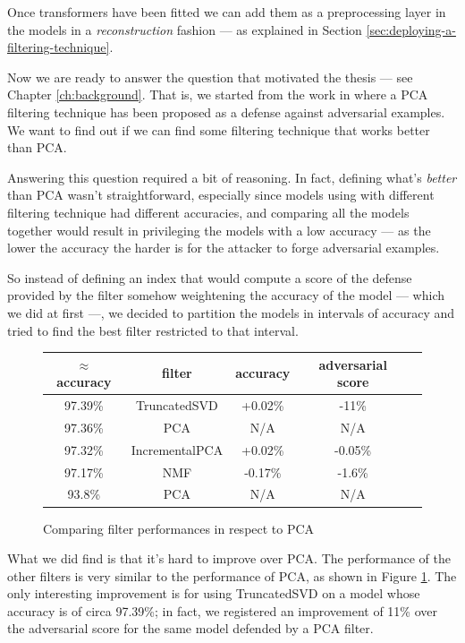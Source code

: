 Once transformers have been fitted we can add them as a preprocessing
layer in the models in a \emph{reconstruction} fashion --- as explained
in Section \ref{sec:deploying-a-filtering-technique}.

Now we are ready to answer the question that motivated the thesis ---
see Chapter \ref{ch:background}. That is, we started from the work in
\cite{bhagoji2018enhancing} where a PCA filtering technique has been
proposed as a defense against adversarial examples. We want to find out
if we can find some filtering technique that works better than PCA.

Answering this question required a bit of reasoning. In fact, defining
what's \emph{better} than PCA wasn't straightforward, especially since
models using with different filtering technique had different
accuracies, and comparing all the models together would result in
privileging the models with a low accuracy --- as the lower the
accuracy the harder is for the attacker to forge adversarial examples.

So instead of defining an index that would compute a score of the
defense provided by the filter somehow weightening the accuracy of the
model --- which we did at first ---, we decided to partition the models
in intervals of accuracy and tried to find the best filter restricted
to that interval.

\begin{figure}
  \centering
  \begin{tabular}{|c|c|c|c|c|}
    \hline
    $\approx$accuracy & filter & accuracy & adversarial score\\
    \hline
    \hline
    97.39\% & TruncatedSVD & +0.02\% & -11\% \\
    \hline
    97.36\% & PCA & N/A & N/A \\
    \hline
    97.32\% & IncrementalPCA & +0.02\% & -0.05\% \\
    \hline
    97.17\% & NMF & -0.17\% & -1.6\% \\
    \hline
    93.8\% & PCA & N/A & N/A \\
    \hline
  \end{tabular}
  \caption{Comparing filter performances in respect to PCA}
  \label{fig:filters-comparison}
\end{figure}

What we did find is that it's hard to improve over PCA. The performance
of the other filters is very similar to the performance of PCA, as
shown in Figure \ref{fig:filters-comparison}. The only interesting
improvement is for using TruncatedSVD on a model whose accuracy is of
circa 97.39\%; in fact, we registered an improvement of 11\% over the
adversarial score for the same model defended by a PCA filter.
